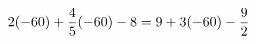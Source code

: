\documentclass[preview]{standalone}
\begin{document}
\begin{align*}
\special{dvisvgm:raw <g id='unique000'>}2(-60) + \frac{4}{5} (-60) - 8 = 9 + 3(-60) - \frac{9}{2}\special{dvisvgm:raw </g>}
\end{align*}
\end{document}

